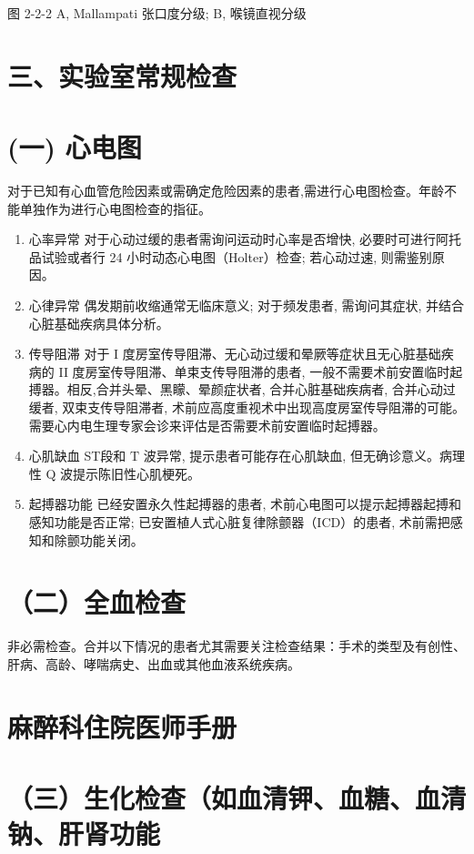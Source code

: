 \documentclass[10pt]{article}
\begin{document}
图 2-2-2 A, Mallampati 张口度分级; B, 喉镜直视分级

\section*{三、实验室常规检查}
\section*{(一) 心电图}
对于已知有心血管危险因素或需确定危险因素的患者,需进行心电图检查。年龄不能单独作为进行心电图检查的指征。

\begin{enumerate}
  \item 心率异常 对于心动过缓的患者需询问运动时心率是否增快, 必要时可进行阿托品试验或者行 24 小时动态心电图（Holter）检查; 若心动过速, 则需鉴别原因。

  \item 心律异常 偶发期前收缩通常无临床意义; 对于频发患者, 需询问其症状, 并结合心脏基础疾病具体分析。

  \item 传导阻滞 对于 I 度房室传导阻滞、无心动过缓和晕厥等症状且无心脏基础疾病的 II 度房室传导阻滞、单束支传导阻滞的患者, 一般不需要术前安置临时起搏器。相反,合并头晕、黑矇、晕颜症状者, 合并心脏基础疾病者, 合并心动过缓者, 双束支传导阻滞者, 术前应高度重视术中出现高度房室传导阻滞的可能。需要心内电生理专家会诊来评估是否需要术前安置临时起搏器。

  \item 心肌缺血 ST段和 $\mathrm{T}$ 波异常, 提示患者可能存在心肌缺血, 但无确诊意义。病理性 $\mathrm{Q}$ 波提示陈旧性心肌梗死。

  \item 起搏器功能 已经安置永久性起搏器的患者, 术前心电图可以提示起搏器起搏和感知功能是否正常; 已安置植人式心脏复律除颤器（ICD）的患者, 术前需把感知和除颤功能关闭。

\end{enumerate}

\section*{（二）全血检查}
非必需检查。合并以下情况的患者尤其需要关注检查结果：手术的类型及有创性、肝病、高龄、哮喘病史、出血或其他血液系统疾病。

\section*{麻醉科住院医师手册}
\section*{（三）生化检查（如血清钾、血糖、血清钠、肝肾功能}
\end{document}
